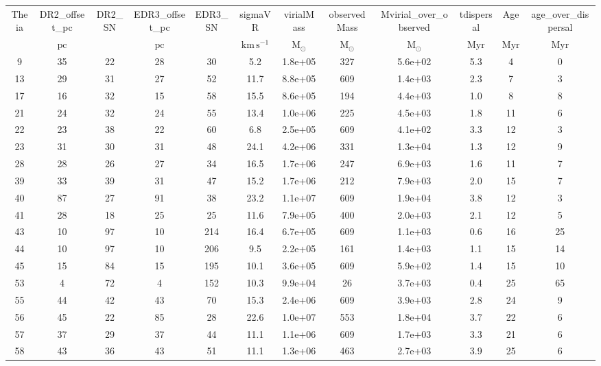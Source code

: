 \begin{table}
\begin{tabular}{cccccccccccc}
Theia & DR2_offset_pc & DR2_SN & EDR3_offset_pc & EDR3_SN & sigmaVR & virialMass & observedMass & Mvirial_over_observed & tdispersal & Age & age_over_dispersal \\
 & $\mathrm{pc}$ &  & $\mathrm{pc}$ &  & $\mathrm{km\,s^{-1}}$ & $\mathrm{M_{\odot}}$ & $\mathrm{M_{\odot}}$ & $\mathrm{M_{\odot}}$ & $\mathrm{Myr}$ & $\mathrm{Myr}$ & $\mathrm{Myr}$ \\
9 & 35 & 22 & 28 & 30 & 5.2 & 1.8e+05 & 327 & 5.6e+02 & 5.3 & 4 & 0 \\
13 & 29 & 31 & 27 & 52 & 11.7 & 8.8e+05 & 609 & 1.4e+03 & 2.3 & 7 & 3 \\
17 & 16 & 32 & 15 & 58 & 15.5 & 8.6e+05 & 194 & 4.4e+03 & 1.0 & 8 & 8 \\
21 & 24 & 32 & 24 & 55 & 13.4 & 1.0e+06 & 225 & 4.5e+03 & 1.8 & 11 & 6 \\
22 & 23 & 38 & 22 & 60 & 6.8 & 2.5e+05 & 609 & 4.1e+02 & 3.3 & 12 & 3 \\
23 & 31 & 30 & 31 & 48 & 24.1 & 4.2e+06 & 331 & 1.3e+04 & 1.3 & 12 & 9 \\
28 & 28 & 26 & 27 & 34 & 16.5 & 1.7e+06 & 247 & 6.9e+03 & 1.6 & 11 & 7 \\
39 & 33 & 39 & 31 & 47 & 15.2 & 1.7e+06 & 212 & 7.9e+03 & 2.0 & 15 & 7 \\
40 & 87 & 27 & 91 & 38 & 23.2 & 1.1e+07 & 609 & 1.9e+04 & 3.8 & 12 & 3 \\
41 & 28 & 18 & 25 & 25 & 11.6 & 7.9e+05 & 400 & 2.0e+03 & 2.1 & 12 & 5 \\
43 & 10 & 97 & 10 & 214 & 16.4 & 6.7e+05 & 609 & 1.1e+03 & 0.6 & 16 & 25 \\
44 & 10 & 97 & 10 & 206 & 9.5 & 2.2e+05 & 161 & 1.4e+03 & 1.1 & 15 & 14 \\
45 & 15 & 84 & 15 & 195 & 10.1 & 3.6e+05 & 609 & 5.9e+02 & 1.4 & 15 & 10 \\
53 & 4 & 72 & 4 & 152 & 10.3 & 9.9e+04 & 26 & 3.7e+03 & 0.4 & 25 & 65 \\
55 & 44 & 42 & 43 & 70 & 15.3 & 2.4e+06 & 609 & 3.9e+03 & 2.8 & 24 & 9 \\
56 & 45 & 22 & 85 & 28 & 22.6 & 1.0e+07 & 553 & 1.8e+04 & 3.7 & 22 & 6 \\
57 & 37 & 29 & 37 & 44 & 11.1 & 1.1e+06 & 609 & 1.7e+03 & 3.3 & 21 & 6 \\
58 & 43 & 36 & 43 & 51 & 11.1 & 1.3e+06 & 463 & 2.7e+03 & 3.9 & 25 & 6 \\

\end{tabular}
\end{table}
